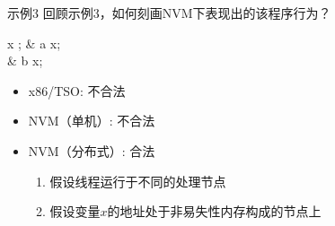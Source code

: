 \documentclass{beamer}
\begin{document}
\begin{frame}{示例3}
    \centering
    回顾示例3，如何刻画NVM下表现出的该程序行为？
    \vfill
	\begin{concurrentcode}
		x ; & a \assigns x;                \\
		& b \assigns x;                   \\
	\end{concurrentcode}

    \begin{itemize}
        \item x86/TSO: 不合法
        \item NVM（单机）: 不合法
        \item NVM（分布式）: 合法
        \begin{enumerate}
            \item 假设线程运行于不同的处理节点
            \item 假设变量$x$的地址处于非易失性内存构成的节点上
        \end{enumerate}
    \end{itemize}
\end{frame}
\end{document}
